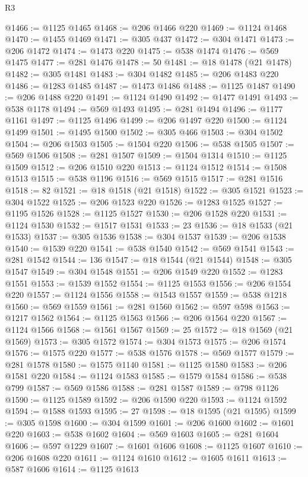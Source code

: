 \begin{lexlean}{R3}
\begin{coremodule}
@1466 := @1125 @1465
@1468 := @206 @1466 @220
@1469 := @1124 @1468
@1470 := @1455 @1469
@1471 := @305 @437
@1472 := @304 @1471
@1473 := @206 @1472
@1474 := @1473 @220
@1475 := @538 @1474
@1476 := @569 @1475
@1477 := @281 @1476
@1478 := 50
@1481 := @18 @1478 (@21 @1478)
@1482 := @305 @1481
@1483 := @304 @1482
@1485 := @206 @1483 @220
@1486 := @1283 @1485
@1487 := @1473 @1486
@1488 := @1125 @1487
@1490 := @206 @1488 @220
@1491 := @1124 @1490
@1492 := @1477 @1491
@1493 := @538 @1178
@1494 := @569 @1493
@1495 := @281 @1494
@1496 := @1177 @1161
@1497 := @1125 @1496
@1499 := @206 @1497 @220
@1500 := @1124 @1499
@1501 := @1495 @1500
@1502 := @305 @466
@1503 := @304 @1502
@1504 := @206 @1503
@1505 := @1504 @220
@1506 := @538 @1505
@1507 := @569 @1506
@1508 := @281 @1507
@1509 := @1504 @1314
@1510 := @1125 @1509
@1512 := @206 @1510 @220
@1513 := @1124 @1512
@1514 := @1508 @1513
@1515 := @538 @1196
@1516 := @569 @1515
@1517 := @281 @1516
@1518 := 82
@1521 := @18 @1518 (@21 @1518)
@1522 := @305 @1521
@1523 := @304 @1522
@1525 := @206 @1523 @220
@1526 := @1283 @1525
@1527 := @1195 @1526
@1528 := @1125 @1527
@1530 := @206 @1528 @220
@1531 := @1124 @1530
@1532 := @1517 @1531
@1533 := 23
@1536 := @18 @1533 (@21 @1533)
@1537 := @305 @1536
@1538 := @304 @1537
@1539 := @206 @1538
@1540 := @1539 @220
@1541 := @538 @1540
@1542 := @569 @1541
@1543 := @281 @1542
@1544 := 136
@1547 := @18 @1544 (@21 @1544)
@1548 := @305 @1547
@1549 := @304 @1548
@1551 := @206 @1549 @220
@1552 := @1283 @1551
@1553 := @1539 @1552
@1554 := @1125 @1553
@1556 := @206 @1554 @220
@1557 := @1124 @1556
@1558 := @1543 @1557
@1559 := @538 @1218
@1560 := @569 @1559
@1561 := @281 @1560
@1562 := @597 @598
@1563 := @1217 @1562
@1564 := @1125 @1563
@1566 := @206 @1564 @220
@1567 := @1124 @1566
@1568 := @1561 @1567
@1569 := 25
@1572 := @18 @1569 (@21 @1569)
@1573 := @305 @1572
@1574 := @304 @1573
@1575 := @206 @1574
@1576 := @1575 @220
@1577 := @538 @1576
@1578 := @569 @1577
@1579 := @281 @1578
@1580 := @1575 @1140
@1581 := @1125 @1580
@1583 := @206 @1581 @220
@1584 := @1124 @1583
@1585 := @1579 @1584
@1586 := @538 @799
@1587 := @569 @1586
@1588 := @281 @1587
@1589 := @798 @1126
@1590 := @1125 @1589
@1592 := @206 @1590 @220
@1593 := @1124 @1592
@1594 := @1588 @1593
@1595 := 27
@1598 := @18 @1595 (@21 @1595)
@1599 := @305 @1598
@1600 := @304 @1599
@1601 := @206 @1600
@1602 := @1601 @220
@1603 := @538 @1602
@1604 := @569 @1603
@1605 := @281 @1604
@1606 := @597 @1229
@1607 := @1601 @1606
@1608 := @1125 @1607
@1610 := @206 @1608 @220
@1611 := @1124 @1610
@1612 := @1605 @1611
@1613 := @587 @1606
@1614 := @1125 @1613

\end{coremodule}
\end{lexlean}
